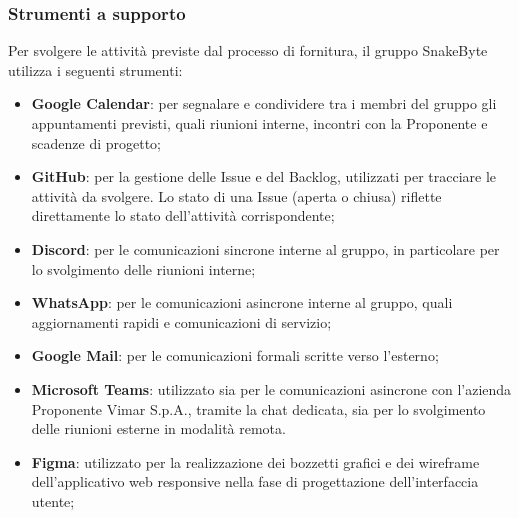 \documentclass[10pt, letterpaper]{article}
\begin{document}
\subsubsection{Strumenti a supporto}
Per svolgere le attività previste dal processo di fornitura, il gruppo SnakeByte 
utilizza i seguenti strumenti:
\begin{itemize}
    \item \textbf{Google Calendar}: per segnalare e condividere tra i membri del 
    gruppo gli appuntamenti previsti, quali riunioni interne, incontri con la 
    Proponente e scadenze di progetto;
    \item \textbf{GitHub}: per la gestione delle Issue e del Backlog, utilizzati 
    per tracciare le attività da svolgere. Lo stato di una Issue (aperta o chiusa) 
    riflette direttamente lo stato dell'attività corrispondente;
    \item \textbf{Discord}: per le comunicazioni sincrone interne al gruppo, in 
    particolare per lo svolgimento delle riunioni interne;
    \item \textbf{WhatsApp}: per le comunicazioni asincrone interne al gruppo, 
    quali aggiornamenti rapidi e comunicazioni di servizio;
    \item \textbf{Google Mail}: per le comunicazioni formali scritte verso 
    l'esterno;
    \item \textbf{Microsoft Teams}: utilizzato sia per le comunicazioni asincrone 
    con l'azienda Proponente Vimar S.p.A., tramite la chat dedicata, sia per lo 
    svolgimento delle riunioni esterne in modalità remota.
    \item \textbf{Figma}: utilizzato per la realizzazione dei bozzetti 
    grafici e dei wireframe dell'applicativo web responsive nella fase 
    di progettazione dell'interfaccia utente;
\end{itemize}
\end{document}

